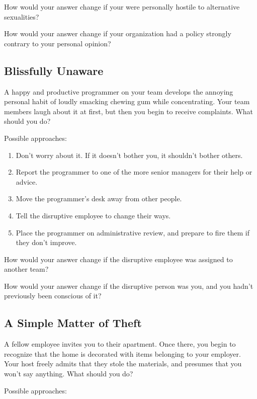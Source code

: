 How would your answer change if your were personally hostile to alternative sexualities?

How would your answer change if your organization had a policy strongly contrary to your personal opinion?


\subsection{Blissfully Unaware}

A happy and productive programmer on your team develops the annoying personal habit of loudly smacking chewing gum while concentrating. Your team members laugh about it at first, but then you begin to receive complaints. What should you do?

Possible approaches:

\begin{enumerate}
\item Don't worry about it. If it doesn't bother you, it shouldn't bother others.
\item Report the programmer to one of the more senior managers for their help or advice.
\item Move the programmer's desk away from other people.
\item Tell the disruptive employee to change their ways.
\item Place the programmer on administrative review, and prepare to fire them if they don't improve.
\end{enumerate}

How would your answer change if the disruptive employee was assigned to another team?

How would your answer change if the disruptive person was you, and you hadn't previously been conscious of it?


\subsection{A Simple Matter of Theft}

A fellow employee invites you to their apartment. Once there, you begin to recognize that the home is decorated with items belonging to your employer. Your host freely admits that they stole the materials, and presumes that you won't say anything. What should you do?

Possible approaches:

